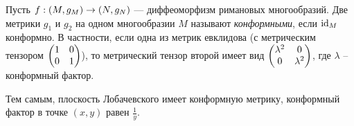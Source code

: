 \documentclass[a4paper]{report}
\begin{document}
    Пусть $f: (M, g_M) \rightarrow (N, g_N)$ --- диффеоморфизм римановых многообразий.
    Две метрики $g_1$ и $g_2$ на одном многообразии $M$ называют \emph{конформными}, если $\operatorname{id}_M$ конформно.
    В частности, если одна из метрик евклидова (с метрическим тензором $\begin{pmatrix}1 & 0 \\ 0 & 1\end{pmatrix}$), то метрический тензор второй имеет вид $\begin{pmatrix}\lambda^2 & 0 \\ 0 & \lambda^2\end{pmatrix}$, где $\lambda$ -- конформный фактор.

    Тем самым, плоскость Лобачевского имеет конформную метрику, конформный фактор в точке $(x, y)$ равен $\frac{1}{y}$.
\end{document}
